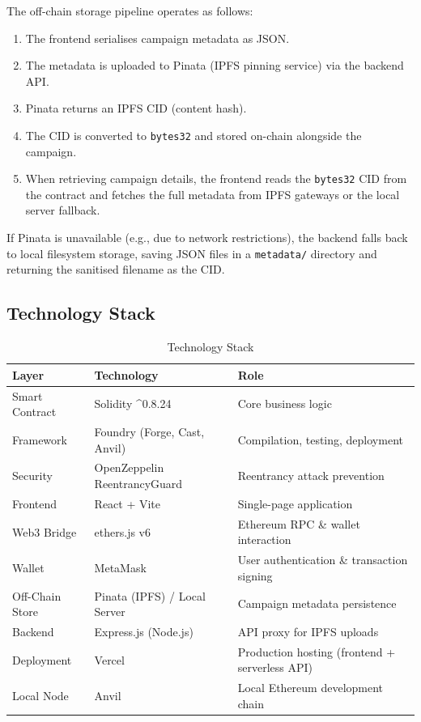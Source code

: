 The off-chain storage pipeline operates as follows:
\begin{enumerate}[leftmargin=1.5em]
    \item The frontend serialises campaign metadata as JSON.
    \item The metadata is uploaded to Pinata (IPFS pinning service) via the backend API.
    \item Pinata returns an IPFS CID (content hash).
    \item The CID is converted to \texttt{bytes32} and stored on-chain alongside the campaign.
    \item When retrieving campaign details, the frontend reads the \texttt{bytes32} CID from the contract and fetches the full metadata from IPFS gateways or the local server fallback.
\end{enumerate}

If Pinata is unavailable (e.g., due to network restrictions), the backend falls back to local filesystem storage, saving JSON files in a \texttt{metadata/} directory and returning the sanitised filename as the CID.

\subsection{Technology Stack}

\begin{table}[H]
\centering
\caption{Technology Stack}
\label{tab:techstack}
\begin{tabularx}{\textwidth}{l l X}
\toprule
\textbf{Layer} & \textbf{Technology} & \textbf{Role} \\
\midrule
Smart Contract  & Solidity \textasciicircum 0.8.24      & Core business logic \\
Framework       & Foundry (Forge, Cast, Anvil)           & Compilation, testing, deployment \\
Security        & OpenZeppelin ReentrancyGuard            & Reentrancy attack prevention \\
Frontend        & React + Vite                            & Single-page application \\
Web3 Bridge     & ethers.js v6                            & Ethereum RPC \& wallet interaction \\
Wallet          & MetaMask                                & User authentication \& transaction signing \\
Off-Chain Store & Pinata (IPFS) / Local Server            & Campaign metadata persistence \\
Backend         & Express.js (Node.js)                    & API proxy for IPFS uploads \\
Deployment      & Vercel                                  & Production hosting (frontend + serverless API) \\
Local Node      & Anvil                                   & Local Ethereum development chain \\
\bottomrule
\end{tabularx}
\end{table}

